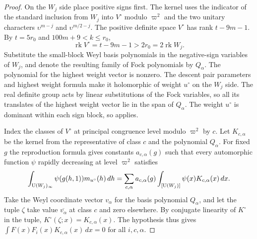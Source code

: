 \begin{proof}
On the $W_j$ side place positive signs first. The kernel uses the indicator of the standard inclusion from $W_j$ into $V^\circ$ modulo $\varpi^2$ and the two unitary characters $\upsilon^{m-j}$ and $\upsilon^{m/2-j}$. The positive definite space $V^\circ$ has rank $t-9m-1$. By $t=5r_0$ and $100m+9<k\le r_0$,
\[
   \operatorname{rk}V^\circ=t-9m-1>2r_0=2\operatorname{rk}W_j .
\]
Substitute the small-block Weyl basis polynomials in the negative-sign variables of $W_j$, and denote the resulting family of Fock polynomials by $Q_\alpha$. The polynomial for the highest weight vector is nonzero. The descent pair parameters and highest weight formula make it holomorphic of weight $u^\circ$ on the $W_j$ side. The real definite group acts by linear substitutions of the Fock variables, so all its translates of the highest weight vector lie in the span of $Q_\alpha$. The weight $u^\circ$ is dominant within each sign block, so  applies.

Index the classes of $V^\circ$ at principal congruence level modulo $\varpi^2$ by $c$. Let $K_{c,\alpha}$ be the kernel from the representative of class $c$ and the polynomial $Q_\alpha$. For fixed $g$ the reproduction formula gives constants $a_{c,\alpha}(g)$ such that every automorphic function $\psi$ rapidly decreasing at level $\varpi^2$ satisfies
\[
 \int_{\operatorname{U}(W_j)_\infty}\psi(g(h,1))m_{u^\circ}(h)\,dh
 =\sum_{c,\alpha}a_{c,\alpha}(g)
    \int_{[\operatorname{U}(W_j)]}\psi(x)K_{c,\alpha}(x)\,dx .
\]
Take the Weyl coordinate vector $v_\alpha$ for the basis polynomial $Q_\alpha$, and let the tuple $\zeta$ take value $\overline{v_\alpha}$ at class $c$ and zero elsewhere. By conjugate linearity of $K^\circ$ in the tuple, $K^\circ(\zeta;x)=K_{c,\alpha}(x)$. The hypothesis thus gives $\int F(x)F_i(x)K_{c,\alpha}(x)\,dx=0$ for all $i,c,\alpha$.


\end{proof}
